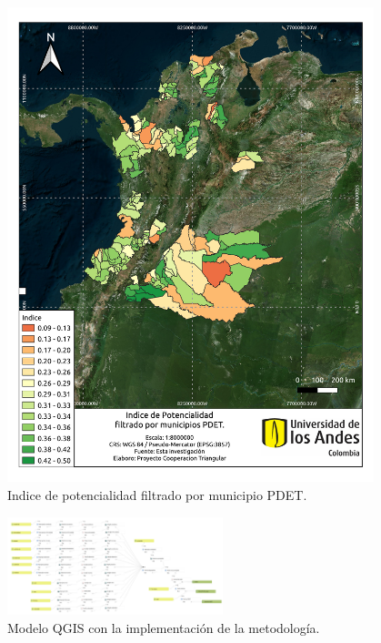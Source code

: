 \begin{figure}
    \centering
    \includegraphics[width=0.95\textwidth]{figures/porpdet}
    \caption{Indice de potencialidad filtrado por municipio PDET.}
    \label{fig:porpdet}
\end{figure}

\begin{figure}
    \centering
    \includegraphics[angle=90, width=0.56\textwidth]{figures/modelo}
    \caption{Modelo QGIS con la implementación de la metodología.}
    \label{fig:modelo}
\end{figure}
